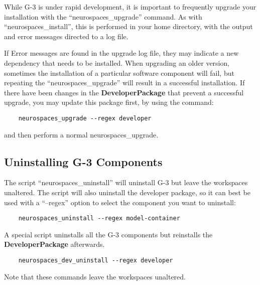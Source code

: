 \documentclass[12pt]{article}
\begin{document}
While G-3 is under rapid development, it is important to frequently
upgrade your installation with the ``neurospaces\_upgrade'' command.
As with ``neurospaces\_install'', this is performed in your home
directory, with the output and error messages directed to a log file.

If Error messages are found in the upgrade log file, they may indicate
a new dependency that needs to be installed.  When upgrading an older
version, sometimes the installation of a particular software component
will fail, but repeating the ``neurospaces\_upgrade'' will result in a
successful installation.  If there have been changes in the {\bf
  DeveloperPackage} that prevent a successful upgrade, you may update
this package first, by using the command:

\begin{verbatim}
    neurospaces_upgrade --regex developer
\end{verbatim}

and then perform a normal neurospaces\_upgrade.
 
\subsection*{Uninstalling G-3 Components}

The script ``neurospaces\_uninstall'' will uninstall G-3 but leave the
workspaces unaltered.  The script will also uninstall the developer
package, so it can best be used with a ``--regex'' option to select
the component you want to uninstall:

\begin{verbatim}
    neurospaces_uninstall --regex model-container
\end{verbatim}

A special script uninstalls all the G-3 components but reinstalls the
{\bf DeveloperPackage} afterwards.

\begin{verbatim}
    neurospaces_dev_uninstall --regex developer
\end{verbatim}

Note that these commands leave the workspaces unaltered.
\end{document}
